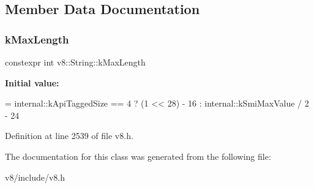 \subsection{Member Data Documentation}
\mbox{\label{classv8_1_1String_a66259940a4836974906729017ff25fd2}} 
\subsubsection{\texorpdfstring{k\+Max\+Length}{kMaxLength}}
{\footnotesize\ttfamily constexpr int v8\+::\+String\+::k\+Max\+Length\hspace{0.3cm}{\ttfamily [static]}}

{\bfseries Initial value\+:}
\begin{DoxyCode}
= internal::kApiTaggedSize == 4
                                        ? (1 << 28) - 16
                                        : internal::kSmiMaxValue / 2 - 24
\end{DoxyCode}


Definition at line 2539 of file v8.\+h.



The documentation for this class was generated from the following file\+:\begin{DoxyCompactItemize}
\item 
v8/include/v8.\+h\end{DoxyCompactItemize}
